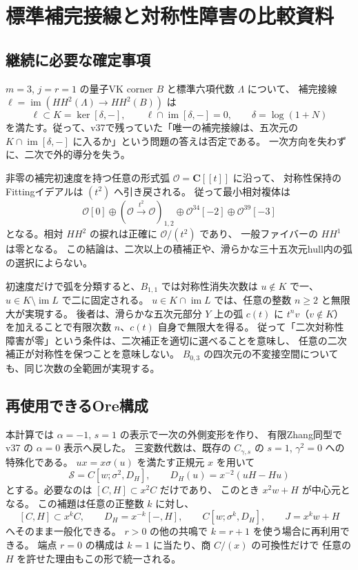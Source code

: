 \section{標準補完接線と対称性障害の比較資料}
\label{sec:completion-notes-v38}

\subsection{継続に必要な確定事項}

$m=3$, $j=r=1$ の量子VK corner $B$ と標準六項代数 $\Lambda$ について、
補完接線 $\ell=\operatorname{im}(HH^2(\Lambda)\to HH^2(B))$ は
\[
 \ell\subset K=\ker[\delta,-],\qquad
 \ell\cap\operatorname{im}[\delta,-]=0,
 \qquad \delta=\log(1+N)
\]
を満たす。従って、v37で残っていた「唯一の補完接線は、五次元の
$K\cap\operatorname{im}[\delta,-]$ に入るか」という問題の答えは否定である。
一次方向を失わずに、二次で外的導分を失う。

非零の補完初速度を持つ任意の形式弧 $\mathcal O=\mathbf C[[t]]$ に沿って、
対称性保持のFittingイデアルは $(t^2)$ へ引き戻される。
従って最小相対複体は
\[
 \mathcal O[0]\oplus
 (\mathcal O\xrightarrow{t^2}\mathcal O)_{1,2}
 \oplus\mathcal O^{34}[-2]\oplus\mathcal O^{39}[-3]
\]
となる。相対 $HH^2$ の捩れは正確に $\mathcal O/(t^2)$ であり、
一般ファイバーの $HH^1$ は零となる。
この結論は、二次以上の積補正や、滑らかな三十五次元hull内の弧の選択によらない。

初速度だけで弧を分類すると、$B_{1,1}$ では対称性消失次数は
$u\notin K$ で一、$u\in K\setminus\operatorname{im}L$ で二に固定される。
$u\in K\cap\operatorname{im}L$ では、任意の整数 $n\ge2$ と無限大が実現する。
後者は、滑らかな五次元部分 $Y$ 上の弧 $c(t)$ に
$t^n v$（$v\notin K$）を加えることで有限次数 $n$、$c(t)$ 自身で無限大を得る。
従って「二次対称性障害が零」という条件は、二次補正を適切に選べることを意味し、
任意の二次補正が対称性を保つことを意味しない。
$B_{0,3}$ の四次元の不変接空間についても、同じ次数の全範囲が実現する。

\subsection{再使用できるOre構成}

本計算では $\alpha=-1$, $s=1$ の表示で一次の外側変形を作り、
有限Zhang同型で v37 の $\alpha=0$ 表示へ戻した。
三変数代数は、既存の $C_{\gamma,s}$ の $s=1$, $\gamma^2=0$ への特殊化である。
$ux=x\sigma(u)$ を満たす正規元 $x$ を用いて
\[
 \mathcal S=C[w;\sigma^2,D_H],\qquad
 D_H(u)=x^{-2}(uH-Hu)
\]
とする。必要なのは $[C,H]\subset x^2C$ だけであり、
このとき $x^2w+H$ が中心元となる。
この補題は任意の正整数 $k$ に対し、
\[
 [C,H]\subset x^kC,\qquad
 D_H=x^{-k}[-,H],\qquad
 C[w;\sigma^k,D_H],\qquad J=x^kw+H
\]
へそのまま一般化できる。
$r>0$ の他の共鳴で $k=r+1$ を使う場合に再利用できる。
端点 $r=0$ の構成は $k=1$ に当たり、商 $C/(x)$ の可換性だけで
任意の $H$ を許せた理由もこの形で統一される。

